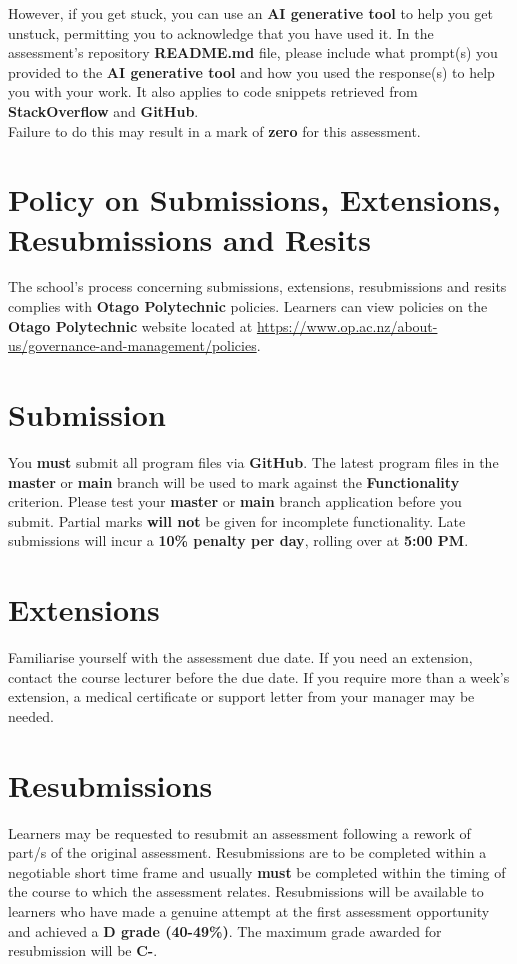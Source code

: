 \documentclass{article}
\begin{document}
 However, if you get stuck, you can use an \textbf{AI generative tool} to help you get unstuck, permitting you to acknowledge that you have used it. In the assessment's repository \textbf{README.md} file, please include what prompt(s) you provided to the \textbf{AI generative tool} and how you used the response(s) to help you with your work. It also applies to code snippets retrieved from \textbf{StackOverflow} and \textbf{GitHub}. \\
 
 Failure to do this may result in a mark of \textbf{zero} for this assessment. 

\section*{Policy on Submissions, Extensions, Resubmissions and Resits}
The school's process concerning submissions, extensions, resubmissions and resits complies with \textbf{Otago Polytechnic} policies. Learners can view policies on the \textbf{Otago Polytechnic} website located at \href{https://www.op.ac.nz/about-us/governance-and-management/policies}{https://www.op.ac.nz/about-us/governance-and-management/policies}.

\section*{Submission}
You \textbf{must} submit all program files via \textbf{GitHub}. The latest program files in the \textbf{master} or \textbf{main} branch will be used to mark against the \textbf{Functionality} criterion. Please test your \textbf{master} or \textbf{main} branch application before you submit. Partial marks \textbf{will not} be given for incomplete functionality. Late submissions will incur a \textbf{10\% penalty per day}, rolling over at \textbf{5:00 PM}.

\section*{Extensions}
Familiarise yourself with the assessment due date. If you need an extension, contact the course lecturer before the due date. If you require more than a week's extension, a medical certificate or support letter from your manager may be needed.

\section*{Resubmissions}
Learners may be requested to resubmit an assessment following a rework of part/s of the original assessment. Resubmissions are to be completed within a negotiable short time frame and usually \textbf{must} be completed within the timing of the course to which the assessment relates. Resubmissions will be available to learners who have made a genuine attempt at the first assessment opportunity and achieved a \textbf{D grade (40-49\%)}. The maximum grade awarded for resubmission will be \textbf{C-}.
\end{document}
